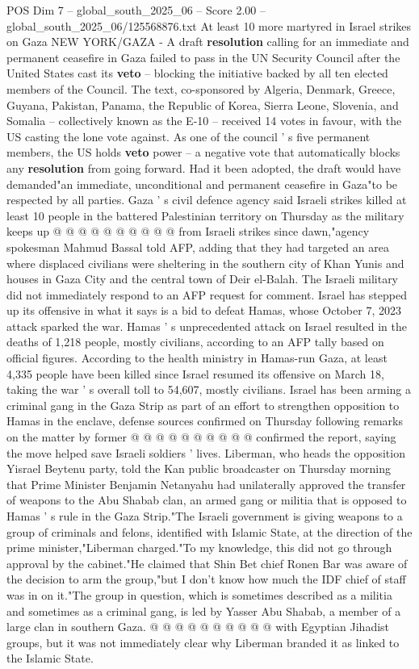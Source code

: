 \begin{textsample}{POS Dim 7 – global\_south\_2025\_06 – Score 2.00 – global\_south\_2025\_06/125568876.txt}  \label{ex:f7_pos_177}
At least 10 more martyred in Israel strikes on Gaza NEW YORK/GAZA - A draft \textbf{resolution} calling for an immediate and permanent ceasefire in Gaza failed to pass in the UN Security Council after the United States cast its \textbf{veto} -- blocking the initiative backed by all ten elected members of the Council.
The text, co-sponsored by Algeria, Denmark, Greece, Guyana, Pakistan, Panama, the Republic of Korea, Sierra Leone, Slovenia, and Somalia -- collectively known as the E-10 -- received 14 votes in favour, with the US casting the lone vote against.
As one of the council ' s five permanent members, the US holds \textbf{veto} power -- a negative vote that automatically blocks any \textbf{resolution} from going forward.
Had it been adopted, the draft would have demanded"an immediate, unconditional and permanent ceasefire in Gaza"to be respected by all parties.
Gaza ' s civil defence agency said Israeli strikes killed at least 10 people in the battered Palestinian territory on Thursday as the military keeps up @ @ @ @ @ @ @ @ @ @ from Israeli strikes since dawn,"agency spokesman Mahmud Bassal told AFP, adding that they had targeted an area where displaced civilians were sheltering in the southern city of Khan Yunis and houses in Gaza City and the central town of Deir el-Balah.
The Israeli military did not immediately respond to an AFP request for comment.
Israel has stepped up its offensive in what it says is a bid to defeat Hamas, whose October 7, 2023 attack sparked the war.
Hamas ' s unprecedented attack on Israel resulted in the deaths of 1,218 people, mostly civilians, according to an AFP tally based on official figures.
According to the health ministry in Hamas-run Gaza, at least 4,335 people have been killed since Israel resumed its offensive on March 18, taking the war ' s overall toll to 54,607, mostly civilians.
Israel has been arming a criminal gang in the Gaza Strip as part of an effort to strengthen opposition to Hamas in the enclave, defense sources confirmed on Thursday following remarks on the matter by former @ @ @ @ @ @ @ @ @ @ confirmed the report, saying the move helped save Israeli soldiers ' lives.
Liberman, who heads the opposition Yisrael Beytenu party, told the Kan public broadcaster on Thursday morning that Prime Minister Benjamin Netanyahu had unilaterally approved the transfer of weapons to the Abu Shabab clan, an armed gang or militia that is opposed to Hamas ' s rule in the Gaza Strip."The Israeli government is giving weapons to a group of criminals and felons, identified with Islamic State, at the direction of the prime minister,"Liberman charged."To my knowledge, this did not go through approval by the cabinet."He claimed that Shin Bet chief Ronen Bar was aware of the decision to arm the group,"but I don't know how much the IDF chief of staff was in on it."The group in question, which is sometimes described as a militia and sometimes as a criminal gang, is led by Yasser Abu Shabab, a member of a large clan in southern Gaza. @ @ @ @ @ @ @ @ @ @ with Egyptian Jihadist groups, but it was not immediately clear why Liberman branded it as linked to the Islamic State.

\end{textsample}
